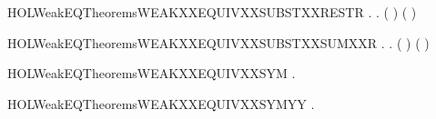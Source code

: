 \newcommand{\HOLWeakEQTheoremsWEAKXXEQUIVXXSUBSTXXRELAB}{\UseVerbatim{HOLWeakEQTheoremsWEAKXXEQUIVXXSUBSTXXRELAB}}
\begin{SaveVerbatim}{HOLWeakEQTheoremsWEAKXXEQUIVXXSUBSTXXRESTR}
\HOLTokenTurnstile{} \HOLSymConst{\HOLTokenForall{}} .    \HOLSymConst{\HOLTokenImp{}} \HOLSymConst{\HOLTokenForall{}}.  (\HOLConst{\ensuremath{\nu}}  ) (\HOLConst{\ensuremath{\nu}}  )
\end{SaveVerbatim}
\newcommand{\HOLWeakEQTheoremsWEAKXXEQUIVXXSUBSTXXRESTR}{\UseVerbatim{HOLWeakEQTheoremsWEAKXXEQUIVXXSUBSTXXRESTR}}
\begin{SaveVerbatim}{HOLWeakEQTheoremsWEAKXXEQUIVXXSUBSTXXSUMXXR}
\HOLTokenTurnstile{} \HOLSymConst{\HOLTokenForall{}} .
          \HOLSymConst{\HOLTokenConj{}}   \HOLSymConst{\HOLTokenConj{}}   \HOLSymConst{\HOLTokenImp{}}
       \HOLSymConst{\HOLTokenForall{}}.  ( \HOLSymConst{\ensuremath{+}} ) ( \HOLSymConst{\ensuremath{+}} )
\end{SaveVerbatim}
\newcommand{\HOLWeakEQTheoremsWEAKXXEQUIVXXSUBSTXXSUMXXR}{\UseVerbatim{HOLWeakEQTheoremsWEAKXXEQUIVXXSUBSTXXSUMXXR}}
\begin{SaveVerbatim}{HOLWeakEQTheoremsWEAKXXEQUIVXXSYM}
\HOLTokenTurnstile{} \HOLSymConst{\HOLTokenForall{}} .    \HOLSymConst{\HOLTokenImp{}}   
\end{SaveVerbatim}
\newcommand{\HOLWeakEQTheoremsWEAKXXEQUIVXXSYM}{\UseVerbatim{HOLWeakEQTheoremsWEAKXXEQUIVXXSYM}}
\begin{SaveVerbatim}{HOLWeakEQTheoremsWEAKXXEQUIVXXSYMYY}
\HOLTokenTurnstile{} \HOLSymConst{\HOLTokenForall{}} .    \HOLSymConst{\HOLTokenEquiv{}}   
\end{SaveVerbatim}
\newcommand{\HOLWeakEQTheoremsWEAKXXEQUIVXXSYMYY}{\UseVerbatim{HOLWeakEQTheoremsWEAKXXEQUIVXXSYMYY}}
